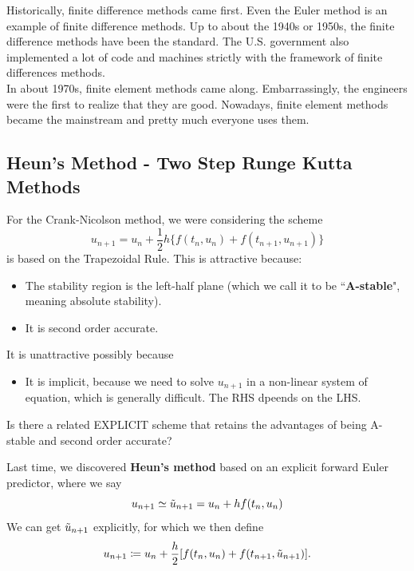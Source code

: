 \documentclass{article}
\begin{document}
\begin{remark}
Historically, finite difference methods came first. Even the Euler method is an example of finite difference methods. Up to about the 1940s or 1950s, the finite difference methods have been the standard. The U.S. government also implemented a lot of code and machines strictly with the framework of finite differences methods.\\

In about 1970s, finite element methods came along. Embarrassingly, the engineers were the first to realize that they are good. Nowadays, finite element methods became the mainstream and pretty much everyone uses them.
\end{remark}

\subsection{Heun's Method - Two Step Runge Kutta Methods}

For the Crank-Nicolson method, we were considering the scheme
\[u_{n+1} = u_n + \frac{1}{2} h \{f(t_n, u_n) + f(t_{n+1}, u_{n+1})\}\]
is based on the Trapezoidal Rule. This is attractive because:
\begin{itemize}
    \item The stability region is the left-half plane (which we call it to be ``\textbf{A-stable}", meaning absolute stability).
    \item It is second order accurate.
\end{itemize}
It is unattractive possibly because 
\begin{itemize}
    \item It is implicit, because we need to solve $u_{n+1}$ in a non-linear system of equation, which is generally difficult. The RHS dpeends on the LHS.
\end{itemize}

\begin{question}
    Is there a related EXPLICIT scheme that retains the advantages of being A-stable and second order accurate?
\end{question}

Last time, we discovered \textbf{Heun's method} based on an explicit forward Euler predictor, where we say
\[u_{n+1} \simeq \Tilde{u}_{n+1} = u_n + h f(t_n, u_n)\]
We can get $\Tilde{u}_{n+1}$ explicitly, for which we then define
\[u_{n+1} \coloneqq u_n + \frac{h}{2} [f(t_n, u_n) + f(t_{n+1}, \Tilde{u}_{n+1})].\]
\end{document}
